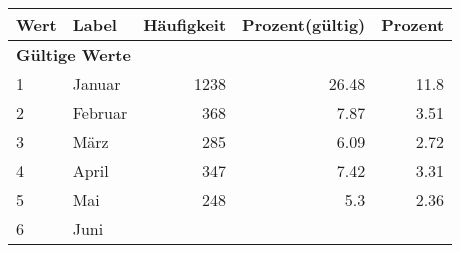      \begin{longtable}{lXrrr}
     \toprule
     \textbf{Wert} & \textbf{Label} & \textbf{Häufigkeit} & \textbf{Prozent(gültig)} & \textbf{Prozent} \\
     \endhead
     \midrule
     \multicolumn{5}{l}{\textbf{Gültige Werte}}\\

     1 &
     \multicolumn{1}{X}{ Januar   } &


       \num{1238} &
       \num[round-mode=places,round-precision=2]{26.48} &
         \num[round-mode=places,round-precision=2]{11.8} \\

     2 &
     \multicolumn{1}{X}{ Februar   } &


       \num{368} &
       \num[round-mode=places,round-precision=2]{7.87} &
         \num[round-mode=places,round-precision=2]{3.51} \\

     3 &
     \multicolumn{1}{X}{ März   } &


       \num{285} &
       \num[round-mode=places,round-precision=2]{6.09} &
         \num[round-mode=places,round-precision=2]{2.72} \\

     4 &
     \multicolumn{1}{X}{ April   } &


       \num{347} &
       \num[round-mode=places,round-precision=2]{7.42} &
         \num[round-mode=places,round-precision=2]{3.31} \\

     5 &
     \multicolumn{1}{X}{ Mai   } &


       \num{248} &
       \num[round-mode=places,round-precision=2]{5.3} &
         \num[round-mode=places,round-precision=2]{2.36} \\

     6 &
     \multicolumn{1}{X}{ Juni   } &



\end{longtable}
